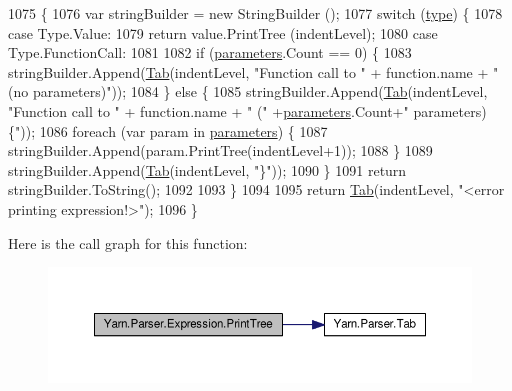 \begin{DoxyCode}
1075             \{
1076                 var stringBuilder = \textcolor{keyword}{new} StringBuilder ();
1077                 \textcolor{keywordflow}{switch} (\hyperlink{a00104_ad55c92df835006328bc2a79a8f91efb9}{type}) \{
1078                 \textcolor{keywordflow}{case} Type.Value:
1079                     \textcolor{keywordflow}{return} value.PrintTree (indentLevel);
1080                 \textcolor{keywordflow}{case} Type.FunctionCall:
1081 
1082                     \textcolor{keywordflow}{if} (\hyperlink{a00104_a7b21380bead8ae08b2cfc6594edab32c}{parameters}.Count == 0) \{
1083                         stringBuilder.Append(\hyperlink{a00149_aa8fa36b46de12a1c561d77b99c4b9ae3}{Tab}(indentLevel, \textcolor{stringliteral}{"Function call to "} + \textcolor{keyword}{function}.name + \textcolor{stringliteral}{"
       (no parameters)"}));
1084                     \} \textcolor{keywordflow}{else} \{
1085                         stringBuilder.Append(\hyperlink{a00149_aa8fa36b46de12a1c561d77b99c4b9ae3}{Tab}(indentLevel, \textcolor{stringliteral}{"Function call to "} + \textcolor{keyword}{function}.name + \textcolor{stringliteral}{" ("}
       +\hyperlink{a00104_a7b21380bead8ae08b2cfc6594edab32c}{parameters}.Count+\textcolor{stringliteral}{" parameters) \{"}));
1086                         \textcolor{keywordflow}{foreach} (var param \textcolor{keywordflow}{in} \hyperlink{a00104_a7b21380bead8ae08b2cfc6594edab32c}{parameters}) \{
1087                             stringBuilder.Append(param.PrintTree(indentLevel+1));
1088                         \}
1089                         stringBuilder.Append(\hyperlink{a00149_aa8fa36b46de12a1c561d77b99c4b9ae3}{Tab}(indentLevel, \textcolor{stringliteral}{"\}"}));
1090                     \}
1091                     \textcolor{keywordflow}{return} stringBuilder.ToString();
1092 
1093                 \}
1094 
1095                 \textcolor{keywordflow}{return} \hyperlink{a00149_aa8fa36b46de12a1c561d77b99c4b9ae3}{Tab}(indentLevel, \textcolor{stringliteral}{"<error printing expression!>"});
1096             \}
\end{DoxyCode}


Here is the call graph for this function\-:
\nopagebreak
\begin{figure}[H]
\begin{center}
\leavevmode
\includegraphics[width=350pt]{a00104_a509ba6d93218203bae56a5a7a82e8261_cgraph}
\end{center}
\end{figure}


